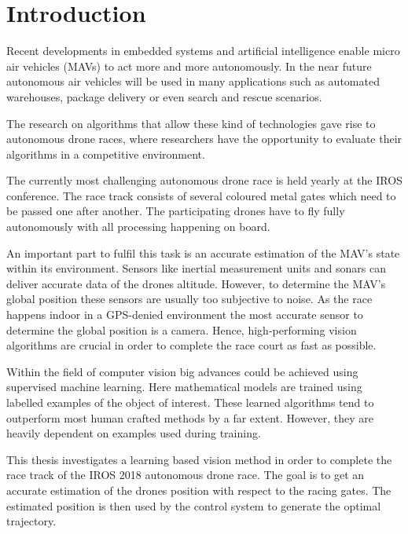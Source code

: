 \chapter{Introduction}
\label{sec:intro}

Recent developments in embedded systems and artificial intelligence enable micro air vehicles (MAVs) to act more and more autonomously. In the near future autonomous air vehicles will be used in many applications such as automated warehouses, package delivery or even search and rescue scenarios.

The research on algorithms that allow these kind of technologies gave rise to autonomous drone races, where researchers have the opportunity to evaluate their algorithms in a competitive environment.

The currently most challenging autonomous drone race is held yearly at the IROS conference. The race track consists of several coloured metal gates which need to be passed one after another. The participating drones have to fly fully autonomously with all processing happening on board.

An important part to fulfil this task is an accurate estimation of the MAV's state within its environment. Sensors like inertial measurement units and sonars can deliver accurate data of the drones altitude. However, to determine the MAV's global position these sensors are usually too subjective to noise. As the race happens indoor in a GPS-denied environment the most accurate sensor to determine the global position is a camera. Hence, high-performing vision algorithms are crucial in order to complete the race court as fast as possible. 

Within the field of computer vision big advances could be achieved using supervised machine learning. Here mathematical models are trained using labelled examples of the object of interest. These learned algorithms tend to outperform most human crafted methods by a far extent. However, they are heavily dependent on examples used during training.

This thesis investigates a learning based vision method in order to complete the race track of the IROS 2018 autonomous drone race. The goal is to get an accurate estimation of the drones position with respect to the racing gates. The estimated position is then used by the control system to generate the optimal trajectory.

